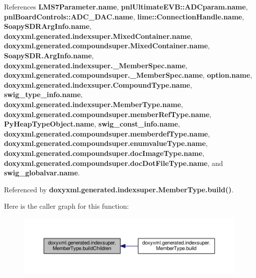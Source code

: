 References {\bf L\+M\+S7\+Parameter.\+name}, {\bf pnl\+Ultimate\+E\+V\+B\+::\+A\+D\+Cparam.\+name}, {\bf pnl\+Board\+Controls\+::\+A\+D\+C\+\_\+\+D\+A\+C.\+name}, {\bf lime\+::\+Connection\+Handle.\+name}, {\bf Soapy\+S\+D\+R\+Arg\+Info.\+name}, {\bf doxyxml.\+generated.\+indexsuper.\+Mixed\+Container.\+name}, {\bf doxyxml.\+generated.\+compoundsuper.\+Mixed\+Container.\+name}, {\bf Soapy\+S\+D\+R.\+Arg\+Info.\+name}, {\bf doxyxml.\+generated.\+indexsuper.\+\_\+\+Member\+Spec.\+name}, {\bf doxyxml.\+generated.\+compoundsuper.\+\_\+\+Member\+Spec.\+name}, {\bf option.\+name}, {\bf doxyxml.\+generated.\+indexsuper.\+Compound\+Type.\+name}, {\bf swig\+\_\+type\+\_\+info.\+name}, {\bf doxyxml.\+generated.\+indexsuper.\+Member\+Type.\+name}, {\bf doxyxml.\+generated.\+compoundsuper.\+member\+Ref\+Type.\+name}, {\bf Py\+Heap\+Type\+Object.\+name}, {\bf swig\+\_\+const\+\_\+info.\+name}, {\bf doxyxml.\+generated.\+compoundsuper.\+memberdef\+Type.\+name}, {\bf doxyxml.\+generated.\+compoundsuper.\+enumvalue\+Type.\+name}, {\bf doxyxml.\+generated.\+compoundsuper.\+doc\+Image\+Type.\+name}, {\bf doxyxml.\+generated.\+compoundsuper.\+doc\+Dot\+File\+Type.\+name}, and {\bf swig\+\_\+globalvar.\+name}.



Referenced by {\bf doxyxml.\+generated.\+indexsuper.\+Member\+Type.\+build()}.



Here is the caller graph for this function\+:
\nopagebreak
\begin{figure}[H]
\begin{center}
\leavevmode
\includegraphics[width=350pt]{d0/da4/classdoxyxml_1_1generated_1_1indexsuper_1_1MemberType_ae1c8c3110ed08813a62ca5ac38904242_icgraph}
\end{center}
\end{figure}


